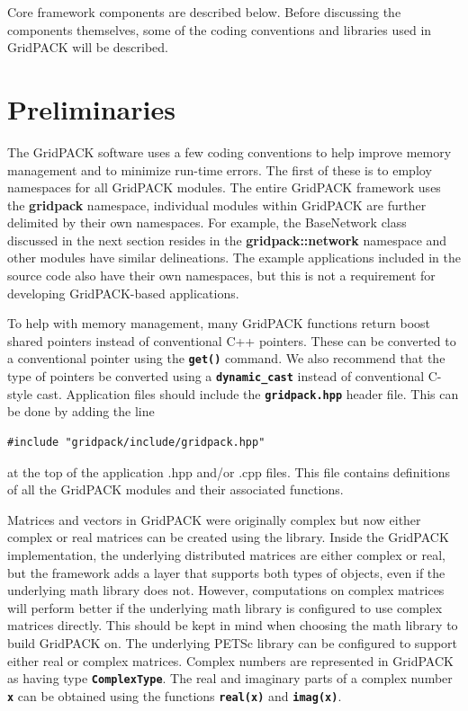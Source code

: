 


Core framework components are described below. Before discussing the components themselves, some of the coding conventions and libraries used in GridPACK will be described.

\section{Preliminaries} The GridPACK software uses a few coding conventions to help improve memory management and to minimize run-time errors. The first of these is to employ namespaces for all GridPACK modules. The entire GridPACK framework uses the \textbf{gridpack} namespace, individual modules within GridPACK are further delimited by their own namespaces. For example, the BaseNetwork class discussed in the next section resides in the \textbf{gridpack::network} namespace and other modules have similar delineations. The example applications included in the source code also have their own namespaces, but this is not a requirement for developing GridPACK-based applications.

To help with memory management, many GridPACK functions return boost shared pointers instead of conventional C++ pointers. These can be converted to a conventional pointer using the \texttt{\textbf{get()}} command. We also recommend that the type of pointers be converted using a \texttt{\textbf{dynamic\_cast}} instead of conventional C-style cast.
Application files should include the \texttt{\textbf{gridpack.hpp}} header file. This can be done by adding the line

{
\color{red}
\begin{Verbatim}[fontseries=b]
    #include "gridpack/include/gridpack.hpp"
\end{Verbatim}
}

at the top of the application .hpp and/or .cpp files. This file contains definitions of all the GridPACK modules and their associated functions.

Matrices and vectors in GridPACK were originally complex but now either complex or real matrices can be created using the library. Inside the GridPACK implementation, the underlying distributed matrices are either complex or real, but the framework adds a layer that supports both types of objects, even if the underlying math library does not. However, computations on complex matrices will perform better if the underlying math library is configured to use complex matrices directly. This should be kept in mind when choosing the math library to build GridPACK on. The underlying PETSc library can be configured to support either real or complex matrices. Complex numbers are represented in GridPACK as having type \texttt{\textbf{ComplexType}}. The real and imaginary parts of a complex number \texttt{\textbf{x}} can be obtained using the functions \texttt{\textbf{real(x)}} and \texttt{\textbf{imag(x)}}.
